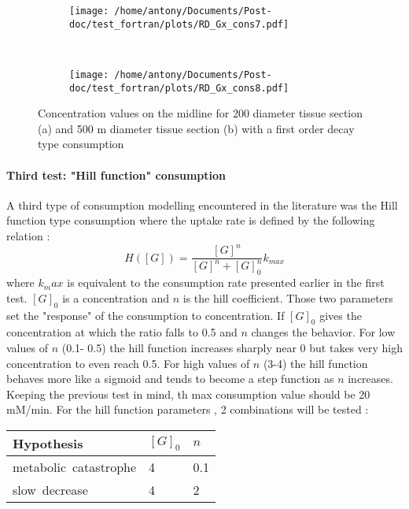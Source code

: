 \documentclass[11pt,a4paper]{article}
\begin{document}
\begin{figure}[ht!]
	\begin{subfigure}{0.45\textwidth}
	\centering
	\texttt{[image: /home/antony/Documents/Post-doc/test\_fortran/plots/RD\_Gx\_cons7.pdf]}
	\caption{ \label{RD_Gx_cons7}}
	\end{subfigure}
	~~
	\begin{subfigure}{0.45\textwidth}
	\texttt{[image: /home/antony/Documents/Post-doc/test\_fortran/plots/RD\_Gx\_cons8.pdf]}
		\caption{ \label{RD_Gx_cons8}}
	\end{subfigure}
	\caption{ Concentration values on the midline for 200 \textmu diameter tissue section (a) and 500 \textmu m diameter tissue section (b) \label{RD_cons8} with a first order decay type consumption}
\end{figure} 

\paragraph{Third test: "Hill function" consumption}
A third type of consumption modelling encountered in the literature was the Hill function type consumption where the uptake rate is defined by the following relation : 
\[ H([G]) = \frac{[G]^n}{[G]^n + [G]^n_{0}}k_{max}  \]
where $k_max$ is equivalent to the consumption rate presented earlier in the first test. $[G]_0$ is a concentration and $n$ is the hill coefficient. Those two parameters set the "response" of the consumption to concentration. If $[G]_0$ gives the concentration at which the ratio falls to 0.5 and $n$ changes the behavior. For low values of $n$ (0.1- 0.5) the hill function increases sharply near 0 but takes very high concentration to even reach 0.5. For high values of $n$ (3-4) the hill function behaves more like a sigmoid and tends to become a step function as $n$ increases. Keeping the previous test in mind, th max consumption value should be 20 mM/min. For the hill function parameters , 2 combinations will be tested :

\begin{center}
\begin{tabular}{ |p{20mm}|p{10mm}|p{10mm}| }
\hline
\textbf{Hypothesis} & $[G]_0$ & $n$  \\
\hline
metabolic\ catastrophe & 4 & 0.1  \\
\hline
slow\ decrease & 4 & 2  \\
\hline
\end{tabular}
\end{center}
\end{document}
